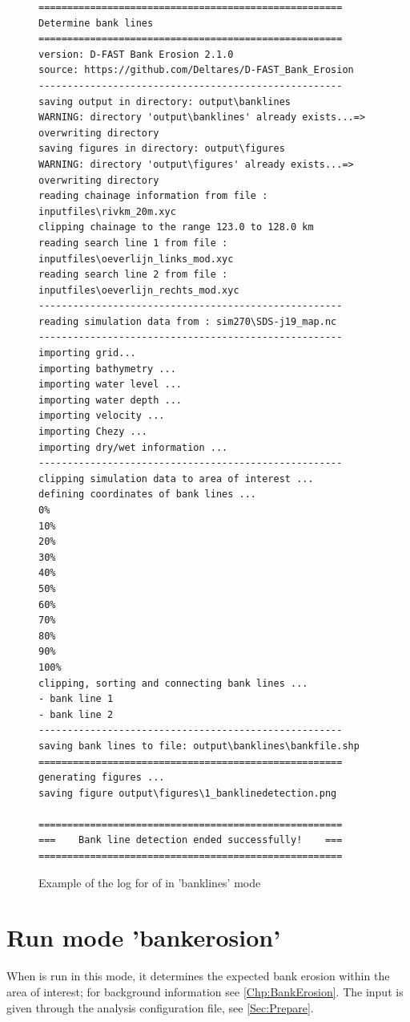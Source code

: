 \begin{figure}[!ht]
\begin{Verbatim}
=====================================================
Determine bank lines
=====================================================
version: D-FAST Bank Erosion 2.1.0
source: https://github.com/Deltares/D-FAST_Bank_Erosion
-----------------------------------------------------
saving output in directory: output\banklines
WARNING: directory 'output\banklines' already exists...=> overwriting directory
saving figures in directory: output\figures
WARNING: directory 'output\figures' already exists...=> overwriting directory
reading chainage information from file : inputfiles\rivkm_20m.xyc
clipping chainage to the range 123.0 to 128.0 km
reading search line 1 from file : inputfiles\oeverlijn_links_mod.xyc
reading search line 2 from file : inputfiles\oeverlijn_rechts_mod.xyc
-----------------------------------------------------
reading simulation data from : sim270\SDS-j19_map.nc
-----------------------------------------------------
importing grid...
importing bathymetry ...
importing water level ...
importing water depth ...
importing velocity ...
importing Chezy ...
importing dry/wet information ...
-----------------------------------------------------
clipping simulation data to area of interest ...
defining coordinates of bank lines ...
0%
10%
20%
30%
40%
50%
60%
70%
80%
90%
100%
clipping, sorting and connecting bank lines ...
- bank line 1
- bank line 2
-----------------------------------------------------
saving bank lines to file: output\banklines\bankfile.shp
=====================================================
generating figures ...
saving figure output\figures\1_banklinedetection.png

=====================================================
===    Bank line detection ended successfully!    ===
=====================================================
\end{Verbatim}
\caption{Example of the log for of \dfastbe in 'banklines' mode}
\label{logbanklines}
\end{figure}

\pagebreak 

\section{Run mode 'bankerosion'} \label{Sec:runerosion}

When \dfastbe is run in this mode, it determines the expected bank erosion within the area of interest; for background information see \autoref{Chp:BankErosion}.
The input is given through the analysis configuration file, see \autoref{Sec:Prepare}.

